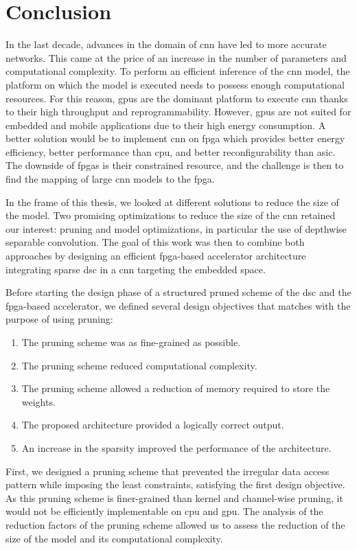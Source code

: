\chapter*{Conclusion}
%
In the last decade, advances in the domain of \acrshort{cnn} have led to more accurate networks. This came at the price of an increase in the number of parameters and computational complexity. To perform an efficient inference of the \acrshort{cnn} model, the platform on which the model is executed needs to possess enough computational resources. For this reason, \acrshort{gpu}s are the dominant platform to execute \acrshort{cnn} thanks to their high throughput and reprogrammability. However, \acrshort{gpu}s are not suited for embedded and mobile applications due to their high energy consumption. A better solution would be to implement \acrshort{cnn} on \acrshort{fpga} which provides better energy efficiency, better performance than \acrshort{cpu}, and better reconfigurability than \acrshort{asic}. The downside of \acrshort{fpga}s is their constrained resource, and the challenge is then to find the mapping of large \acrshort{cnn} models to the \acrshort{fpga}.

In the frame of this thesis, we looked at different solutions to reduce the size of the model. Two promising optimizations to reduce the size of the \acrshort{cnn} retained our interest: pruning and model optimizations, in particular the use of depthwise separable convolution. The goal of this work was then to combine both approaches by designing an efficient \acrshort{fpga}-based accelerator architecture integrating sparse \acrshort{dsc} in a \acrshort{cnn} targeting the embedded space.

Before starting the design phase of a structured pruned scheme of the \acrshort{dsc} and the \acrshort{fpga}-based accelerator, we defined several design objectives that matches with the purpose of using pruning:
%
\begin{enumerate}
    \item The pruning scheme was as fine-grained as possible.
    \item The pruning scheme reduced computational complexity.
    \item The pruning scheme allowed a reduction of memory required to store the weights.
    \item The proposed architecture provided a logically correct output.
    \item An increase in the sparsity improved the performance of the architecture.
\end{enumerate}
%
First, we designed a pruning scheme that prevented the irregular data access pattern while imposing the least constraints, satisfying the first design objective. As this pruning scheme is finer-grained than kernel and channel-wise pruning, it would not be efficiently implementable on \acrshort{cpu} and \acrshort{gpu}. The analysis of the reduction factors of the pruning scheme allowed us to assess the reduction of the size of the model and its computational complexity.

